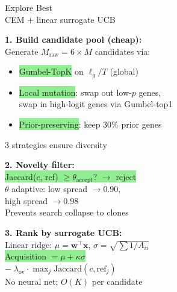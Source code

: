 \documentclass[8pt]{article}
\newlength{\colw}
\begin{document}
\begin{minipage}[t]{\colw}
\begin{tcolorbox}[colback=hdrB, colframe=hdrB, fontupper=\bfseries\footnotesize\color{white},
    arc=2pt, left=2pt, right=2pt, top=1pt, bottom=1pt]
\centering Explore Best\\[-2pt]
{\scriptsize\mdseries CEM + linear surrogate UCB}
\end{tcolorbox}
\vspace{1pt}

\begin{keyboxG}
\textbf{1. Build candidate pool (cheap):}\\
Generate $M_\text{raw} = 6 \times M$ candidates via:
\begin{itemize}[leftmargin=1em, itemsep=0pt, topsep=1pt, parsep=0pt]
\item \colorbox{lightgreen}{Gumbel-TopK} on $\ell_g/T$ (global)
\item \colorbox{lightgreen}{Local mutation}: swap out low-$p$ genes,\\swap in high-logit genes via Gumbel-top1
\item \colorbox{lightgreen}{Prior-preserving}: keep $30\%$ prior genes
\end{itemize}
{\scriptsize\color{added} 3 strategies ensure diversity}
\end{keyboxG}\vspace{1pt}

\begin{keyboxG}
\textbf{2. Novelty filter:}\\
\colorbox{lightgreen}{Jaccard($c$, ref) $\geq \theta_\text{accept}$? $\to$ reject}\\
$\theta$ adaptive: low spread $\to 0.90$,\\
high spread $\to 0.98$\\
{\scriptsize\color{added} Prevents search collapse to clones}
\end{keyboxG}\vspace{1pt}

\begin{keyboxG}
\textbf{3. Rank by surrogate UCB:}\\
Linear ridge: $\mu = \mathbf{w}^\top \mathbf{x}$,\;
$\sigma = \sqrt{\sum 1/A_{ii}}$\\
\colorbox{lightgreen}{Acquisition $= \mu + \kappa\sigma$}\\
$-\;\lambda_\text{ov} \cdot \max_j \text{Jaccard}(c, \text{ref}_j)$\\
{\scriptsize\color{added} No neural net; $O(K)$ per candidate}
\end{keyboxG}\vspace{1pt}


\end{minipage}
\end{document}
